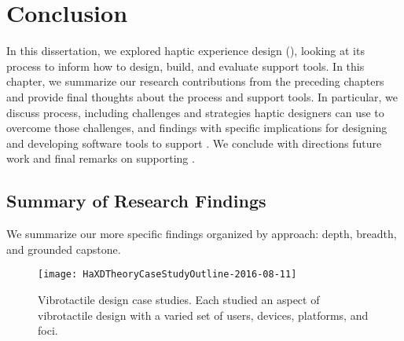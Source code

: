 \chapter{Conclusion}
\label{ch:conclusion}
In this dissertation, we explored haptic experience design (\haxd), looking at its process to inform how to design, build, and evaluate \haxd support tools.
In this chapter, we summarize our research contributions from the preceding chapters and provide final thoughts about the \haxd process and support tools.
In particular, we discuss process, including challenges and strategies haptic designers can use to overcome those challenges, and
findings with specific implications for designing and developing software tools to support \haxd.
We conclude with directions future work and final remarks on supporting \haxd.



%
%
\section{Summary of Research Findings}
We summarize our more specific findings organized by approach: depth, breadth, and grounded capstone.


\begin{figure}[htbp]
\begin{center}
\texttt{[image: HaXDTheoryCaseStudyOutline-2016-08-11]}
\caption{Vibrotactile design case studies. Each studied an aspect of vibrotactile design with a varied set of users, devices, platforms, and foci.}
\label{fig:intro:casestudyoverview}
\end{center}
\end{figure}



